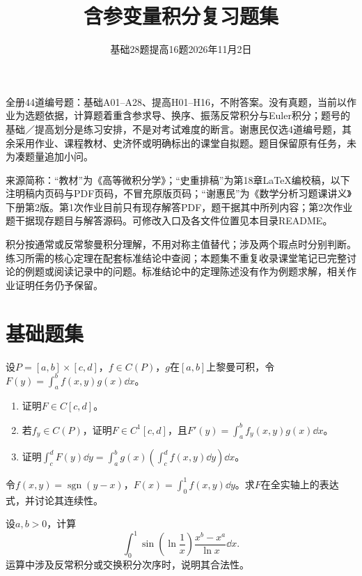 
\title{含参变量积分复习题集}
\author{}\date{基础28题\quad 提高16题\qquad 2026年11月2日}
\maketitle
\scope

全册44道编号题：基础A01--A28、提高H01--H16，不附答案。没有真题，当前以作业为选题依据，计算题着重含参求导、换序、振荡反常积分与Euler积分；题号的基础／提高划分是练习安排，不是对考试难度的断言。谢惠民仅选4道编号题，其余采用作业、课程教材、史济怀或明确标出的课堂自拟题。题目保留原有任务，未为凑题量追加小问。

来源简称：“教材”为《高等微积分学》；“史重排稿”为第18章LaTeX编校稿，以下注明稿内页码与PDF页码，不冒充原版页码；“谢惠民”为《数学分析习题课讲义》下册第2版。第1次作业目前只有现存解答PDF，题干据其中所列内容；第2次作业题干据现存题目与解答源码。可修改入口及各文件位置见本目录README。

积分按通常或反常黎曼积分理解，不用对称主值替代；涉及两个瑕点时分别判断。练习所需的核心定理在配套标准结论中查阅；本题集不重复收录课堂笔记已完整讨论的例题或阅读记录中的问题。标准结论中的定理陈述没有作为例题求解，相关作业证明任务仍予保留。
\tableofcontents\clearpage
\section{基础题集}
设$P=[a,b]\times[c,d]$，$f\in C(P)$，$g$在$[a,b]$上黎曼可积，令$F(y)=\int_a^bf(x,y)g(x)\dd x$。
\begin{enumerate}[label=(\arabic*)]
\item 证明$F\in C[c,d]$。
\item 若$f_y\in C(P)$，证明$F\in C^1[c,d]$，且$F'(y)=\int_a^bf_y(x,y)g(x)\dd x$。
\item 证明$\int_c^dF(y)\dd y=\int_a^b g(x)(\int_c^df(x,y)\dd y)\dd x$。
\end{enumerate}

令$f(x,y)=\operatorname{sgn}(y-x)$，$F(x)=\int_0^1f(x,y)\dd y$。求$F$在全实轴上的表达式，并讨论其连续性。

设$a,b>0$，计算
\[
 \int_0^1\sin\!\left(\ln\frac1x\right)\frac{x^b-x^a}{\ln x}\dd x.
\]
运算中涉及反常积分或交换积分次序时，说明其合法性。

